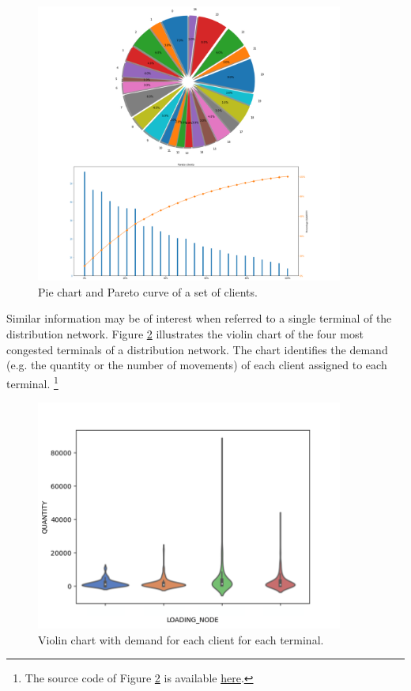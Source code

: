\begin{figure}[hbt!]
\centering
\includegraphics[width=0.9\textwidth]{SectionDistribution/control_figures/fig_paretoClient.png}
\captionsetup{type=figure}
\caption{Pie chart and Pareto curve of a set of clients.}
\label{fig_paretoClient}
\end{figure}

Similar information may be of interest when referred to a single terminal of the distribution network. Figure \ref{fig_violinClient} illustrates the violin chart of the four most congested terminals of a distribution network. The chart identifies the demand (e.g. the quantity or the number of movements) of each client assigned to each terminal. \footnote{The source code of Figure \ref{fig_violinClient} is available \href{https://github.com/aletuf93/logproj/blob/master/examples/DIST_01\%20Supply\%20Chain\%20Assessment.ipynb}{here}.}

\begin{figure}[hbt!]
\centering
\includegraphics[width=0.9\textwidth]{SectionDistribution/control_figures/fig_violinClient.png}
\captionsetup{type=figure}
\caption{Violin chart with demand for each client for each terminal.}
\label{fig_violinClient}
\end{figure}

